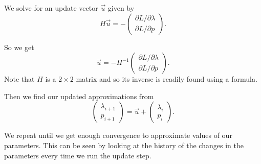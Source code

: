 \documentclass{article}
\newcommand{\pRun}{p}
\begin{document}
We solve for an update vector \(\vec u\) given by
\begin{equation}
H \vec u = - \begin{pmatrix} \partial L / \partial \lambda \\ \partial L / \partial \pRun \end{pmatrix}.
\end{equation}

So we get 
\begin{equation}
\vec u = - H^{-1} \begin{pmatrix} \partial L / \partial \lambda \\ \partial L / \partial \pRun \end{pmatrix}.
\end{equation}
Note that \(H\) is a \(2\times2\) matrix and so its inverse is readily found using a formula.

Then we find our updated approximations from 
\begin{equation}
\begin{pmatrix} \lambda_{i+1} \\ \pRun_{i+1} \end{pmatrix} = 
\vec u + \begin{pmatrix} \lambda_i \\ \pRun_i \end{pmatrix}.
\end{equation}

We repeat until we get enough convergence to approximate values of our parameters. This can be seen by looking at the history of the changes in the parameters every time we run the update step.
\end{document}
